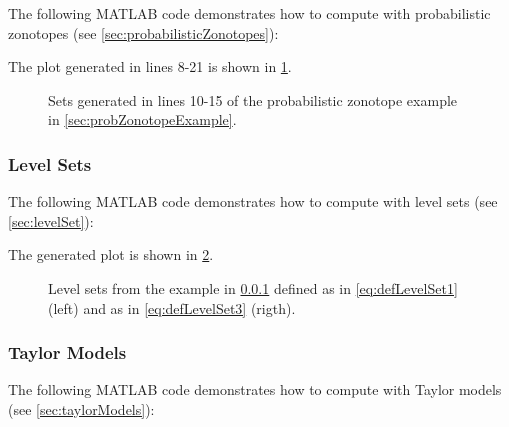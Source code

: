 The following MATLAB code demonstrates how to compute with probabilistic zonotopes (see \cref{sec:probabilisticZonotopes}):



{\small
}

The plot generated in lines 8-21 is shown in \cref{fig:probZonotopeExample}.

\begin{figure}[h!tb]
  \centering
  \caption{Sets generated in lines 10-15 of the probabilistic zonotope example in \cref{sec:probZonotopeExample}.}
  \label{fig:probZonotopeExample}
\end{figure}




\newpage
\subsubsection{Level Sets}	\label{sec:levelSetExample}

The following MATLAB code demonstrates how to compute with level sets (see \cref{sec:levelSet}):

{\small
	}

The generated plot is shown in \cref{fig:levelSet}.

\begin{figure}[h!tb]
	\centering
		\caption{Level sets from the example in \cref{sec:levelSetExample} defined as in \eqref{eq:defLevelSet1} (left) and as in \eqref{eq:defLevelSet3} (rigth).}
		\label{fig:levelSet}
\end{figure}





\newpage
\subsubsection{Taylor Models}	\label{sec:taylorModelExample}

The following MATLAB code demonstrates how to compute with Taylor models (see \cref{sec:taylorModels}):

